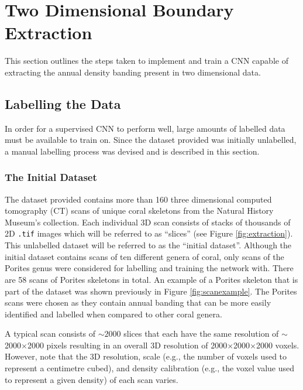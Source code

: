 \section{Two Dimensional Boundary Extraction}

This section outlines the steps taken to implement and train a CNN capable of extracting the annual density banding present in two dimensional data.

\subsection{Labelling the Data}
\label{sec:2dlabel}

In order for a supervised CNN to perform well, large amounts of labelled data must be available to train on. Since the dataset provided was initially unlabelled, a manual labelling process was devised and is described in this section.

\subsubsection{The Initial Dataset}

The dataset provided contains more than 160 three dimensional computed tomography (CT) scans of unique coral skeletons from the Natural History Museum's collection. Each individual 3D scan consists of stacks of thousands of 2D \texttt{.tif} images which will be referred to as ``slices'' (see Figure \ref{fig:extraction}). This unlabelled dataset will be referred to as the ``initial dataset''. Although the initial dataset contains scans of ten different genera of coral, only scans of the Porites genus were considered for labelling and training the network with. There are 58 scans of Porites skeletons in total. An example of a Porites skeleton that is part of the dataset was shown previously in Figure \ref{fig:scanexample}. The Porites scans were chosen as they contain annual banding that can be more easily identified and labelled when compared to other coral genera.

A typical scan consists of ${\sim}2000$ slices that each have the same resolution of ${\sim}$2000$\times$2000 pixels resulting in an overall 3D resolution of 2000$\times$2000$\times$2000 voxels. However, note that the 3D resolution, scale (e.g., the number of voxels used to represent a centimetre cubed), and density calibration (e.g., the voxel value used to represent a given density) of each scan varies.

